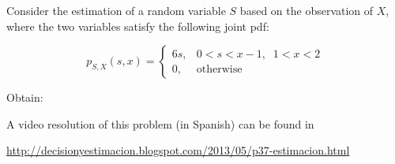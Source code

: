 \else

\question Consider the estimation of a random variable $S$ based on the observation of $X$, where the two variables satisfy the following joint pdf:

$$p_{S,X}(s,x)= \left\lbrace  \begin{array}{ll} 6s, & 0<s<x-1, \; \; 1<x<2 \\
0, & \mbox{otherwise}  \end{array}  \right. $$

Obtain:

 \begin{solution}
 
 A video resolution of this problem (in Spanish) can be found in
 
\url{http://decisionyestimacion.blogspot.com/2013/05/p37-estimacion.html}

 \end{solution}

\fi